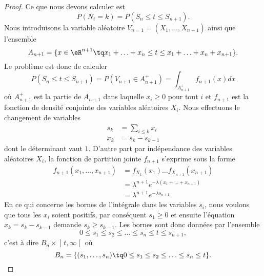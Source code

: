 \begin{proof}
Ce que nous devons calculer est
\begin{equation}
    P(N_t=k)=P(S_{n}\leq t\leq S_{n+1}).
\end{equation}
Nous introduisons la variable aléatoire \( V_{n=1}=(X_1,\ldots,X_{n+1})\) ainsi que l'ensemble
\begin{equation}
    A_{n+1}=\{ x\in\eR^{n+1}\tq x_1+\ldots+x_n\leq t\leq x_1+\ldots+x_n+x_{n+1} \}.
\end{equation}
Le problème est donc de calculer
\begin{equation}
    P(S_n\leq t\leq S_{n+1})=P(V_{n+1}\in A_{n+1}^+)=\int_{A_{n+1}^+}f_{n+1}(x)dx
\end{equation}
où \( A_{n+1}^+\) est la partie de $A_{n+1}$ dans laquelle \( x_i\geq 0\) pour tout \( i\) et \( f_{n+1}\) est la fonction de densité conjointe des variables aléatoires \( X_i\). Nous effectuons le changement de variables
\begin{subequations}
    \begin{align}
        s_k&=\sum_{i\leq k}x_i\\
        x_k&=s_k-s_{k-1}
    \end{align}
\end{subequations}
dont le déterminant vaut \( 1\). D'autre part par indépendance des variables aléatoires \( X_i\), la fonction de partition jointe \( f_{n+1}\) s'exprime sous la forme
\begin{subequations}
    \begin{align}
        f_{n+1}(x_1,\ldots,x_{n+1})&=f_{X_1}(x_1)\ldots f_{X_{n+1}}(x_{n+1})\\
        &=\lambda^{n+1} e^{-\lambda(x_1+\ldots+x_{n+1})}\\
        &=\lambda^{n+1} e^{-\lambda s_{n+1}}.
    \end{align}
\end{subequations}
En ce qui concerne les bornes de l'intégrale dans les variables \( s_i\), nous voulons que tous les \( x_i\) soient positifs, par conséquent \( s_1\geq 0\) et ensuite l'équation \( x_k=s_k-s_{k-1}\) demande \( s_k\geq s_{k-1}\). Les bornes sont donc données par l'ensemble
\begin{equation}
    0\leq s_1\leq s_2\leq\ldots\leq s_n\leq t\leq s_{n+1},
\end{equation}
c'est à dire \( B_n\times \mathopen] t , \infty \mathclose[\) où 
\begin{equation}
    B_n=\{ (s_1,\ldots,s_n)\tq 0\leq s_1\leq s_2\leq\ldots\leq s_n\leq t \}.

\end{equation}
\end{proof}
